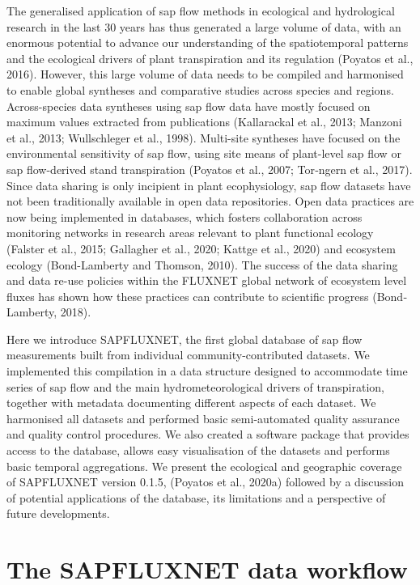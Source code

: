 \documentclass[11pt,twoside]{reedthesis}
\begin{document}
The generalised application of sap flow methods in ecological and
hydrological research in the last 30 years has thus generated a large
volume of data, with an enormous potential to advance our understanding
of the spatiotemporal patterns and the ecological drivers of plant
transpiration and its regulation (Poyatos et al., 2016). However, this
large volume of data needs to be compiled and harmonised to enable
global syntheses and comparative studies across species and regions.
Across-species data syntheses using sap flow data have mostly focused on
maximum values extracted from publications (Kallarackal et al., 2013;
Manzoni et al., 2013; Wullschleger et al., 1998). Multi-site syntheses
have focused on the environmental sensitivity of sap flow, using site
means of plant-level sap flow or sap flow-derived stand transpiration
(Poyatos et al., 2007; Tor‐ngern et al., 2017). Since data sharing is
only incipient in plant ecophysiology, sap flow datasets have not been
traditionally available in open data repositories. Open data practices
are now being implemented in databases, which fosters collaboration
across monitoring networks in research areas relevant to plant
functional ecology (Falster et al., 2015; Gallagher et al., 2020; Kattge
et al., 2020) and ecosystem ecology (Bond-Lamberty and Thomson, 2010).
The success of the data sharing and data re-use policies within the
FLUXNET global network of ecosystem level fluxes has shown how these
practices can contribute to scientific progress (Bond‐Lamberty,
2018).\par

Here we introduce SAPFLUXNET, the first global database of sap flow
measurements built from individual community-contributed datasets. We
implemented this compilation in a data structure designed to accommodate
time series of sap flow and the main hydrometeorological drivers of
transpiration, together with metadata documenting different aspects of
each dataset. We harmonised all datasets and performed basic
semi-automated quality assurance and quality control procedures. We also
created a software package that provides access to the database, allows
easy visualisation of the datasets and performs basic temporal
aggregations. We present the ecological and geographic coverage of
SAPFLUXNET version 0.1.5, (Poyatos et al., 2020a) followed by a
discussion of potential applications of the database, its limitations
and a perspective of future developments. \par

\section{The SAPFLUXNET data
workflow}\label{the-sapfluxnet-data-workflow}
\end{document}
